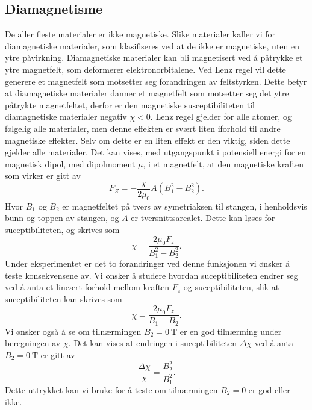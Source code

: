 \documentclass[%
 reprint,
 amsmath,amssymb,
 aps,
 norsk,
]{revtex4-1}
\begin{document}
\subsection{Diamagnetisme}
De aller fleste materialer er ikke magnetiske. Slike materialer kaller vi for diamagnetiske materialer, som klasifiseres ved at de ikke er magnetiske, uten en ytre påvirkning. Diamagnetiske materialer kan bli magnetisert ved å påtrykke et ytre magnetfelt, som deformerer elektronorbitalene. Ved Lenz regel vil dette generere et magnetfelt som motsetter seg forandringen av feltstyrken. Dette betyr at diamagnetiske materialer danner et magnetfelt som motsetter seg det ytre påtrykte magnetfeltet, derfor er den magnetiske susceptibiliteten til diamagnetiske materialer negativ $\chi < 0$. Lenz regel gjelder for alle atomer, og følgelig alle materialer, men denne effekten er svært liten iforhold til andre magnetiske effekter. Selv om dette er en liten effekt er den viktig, siden dette gjelder alle materialer. Det kan vises, med utgangspunkt i potensiell energi for en magnetisk dipol, med dipolmoment $\mu$, i et magnetfelt, at den magnetiske kraften som virker er gitt av
\begin{equation}
  F_Z = -\frac{\chi}{2\mu_0}A\left(B_1^2 - B_2^2\right). \label{vismut}
\end{equation}
Hvor $B_1$ og $B_2$ er magnetfeltet på tvers av symetriaksen til stangen, i henholdsvis bunn og toppen av stangen, og $A$ er tversnittsarealet. Dette kan løses for suceptibiliteten, og skrives som
\begin{equation}
  \chi = \frac{2\mu_0F_z}{B_1^2 - B_2^2}.
\end{equation}
Under eksperimentet er det to forandringer ved denne funksjonen vi ønsker å teste konsekvensene av. Vi ønsker å studere hvordan suceptibiliteten endrer seg ved å anta et lineært forhold mellom kraften $F_z$ og suceptibiliteten, slik at suceptibiliteten kan skrives som
\begin{equation}
  \chi = \frac{2\mu_0F_z}{B_1 - B_2}.\label{lin_chi}
\end{equation}
Vi ønsker også å se om tilnærmingen $B_2=\SI{0}{\tesla}$ er en god tilnærming under beregningen av $\chi$. Det kan vises at endringen i suceptibiliteten $\Delta \chi$ ved å anta $B_2=\SI{0}{\tesla}$ er gitt av
\begin{equation}
  \frac{\Delta \chi}{\chi} = \frac{B_2^2}{B_1^2}. \label{test_chi}
\end{equation}
Dette uttrykket kan vi bruke for å teste om tilnærmingen $B_2=0$ er god eller ikke.
\end{document}

